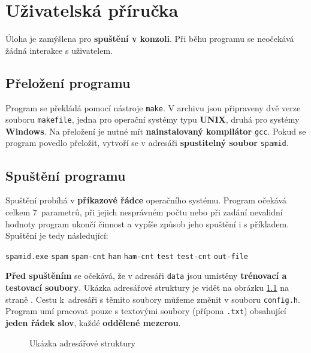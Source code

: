 \documentclass[12pt]{report}
\newcommand\la{\textlangle}  					%
\newcommand\ra{\textrangle}						%
\newcommand\laratexttt[1]{\la\texttt{#1}\ra}	%
\newcommand\indentt[1]{						
	\setlength\parindent{5mm}
	#1
	\setlength\parindent{0mm}
	}											%
\begin{document}
	\chapter{Uživatelská příručka}
	Úloha je zamýšlena pro \textbf{spuštění v konzoli}. Při běhu programu se neočekává žádná interakce s uživatelem.
	
	\section{Přeložení programu}
	Program se překládá pomocí nástroje \texttt{make}. V archivu jsou připraveny dvě verze souboru \texttt{makefile}, jedna pro operační systémy typu \textbf{UNIX}, druhá pro systémy \textbf{Windows}. Na přeložení je nutné mít \textbf{nainstalovaný kompilátor} \texttt{gcc}. Pokud se program povedlo přeložit, vytvoří se v adresáři \textbf{spustitelný soubor} \texttt{spamid}.
		
	\section{Spuštění programu}
	Spuštění probíhá v \textbf{příkazové řádce} operačního systému. Program očekává celkem 7~parametrů, při jejich nesprávném počtu nebo při zadání nevalidní hodnoty program ukončí činnost a vypíše způsob jeho spuštění i s příkladem. Spuštění je tedy následující:
	
	\indentt{\texttt{spamid.exe} \laratexttt{spam} \laratexttt{spam-cnt} \laratexttt{ham} \laratexttt{ham-cnt} \laratexttt{test} \laratexttt{test-cnt} \laratexttt{out-file}$\,$\keys{\return}}
	
	\textbf{Před spuštěním} se očekává, že v adresáři \texttt{data} jsou umístěny \textbf{trénovací a testovací soubory}. Ukázka adresářové struktury je vidět na obrázku \ref{fig:struktura} na straně \pageref{fig:struktura}. Cestu k~adresáři s těmito soubory můžeme změnit v souboru \texttt{config.h}. Program umí pracovat pouze s textovými soubory (přípona \texttt{.txt}) obsahující \textbf{jeden řádek slov}, každé \textbf{oddělené mezerou}.
	
	\begin{figure}
		\centering
		\begin{minipage}{40mm}
		\end{minipage}
		\caption{Ukázka adresářové struktury}
		\label{fig:struktura}
	\end{figure}
	
\end{document}
